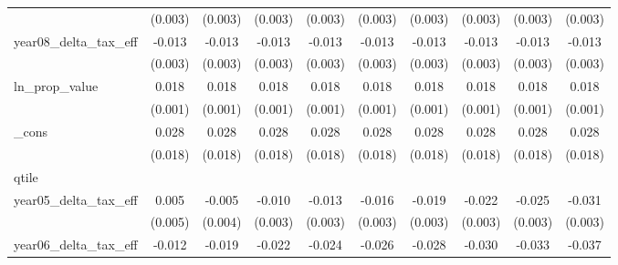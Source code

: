 {\begin{tabular}{l*{9}{c}}
            &     (0.003)         &     (0.003)         &     (0.003)         &     (0.003)         &     (0.003)         &     (0.003)         &     (0.003)         &     (0.003)         &     (0.003)         \\
[1em]
year08_delta_tax_eff&      -0.013\sym{***}&      -0.013\sym{***}&      -0.013\sym{***}&      -0.013\sym{***}&      -0.013\sym{***}&      -0.013\sym{***}&      -0.013\sym{***}&      -0.013\sym{***}&      -0.013\sym{***}\\
            &     (0.003)         &     (0.003)         &     (0.003)         &     (0.003)         &     (0.003)         &     (0.003)         &     (0.003)         &     (0.003)         &     (0.003)         \\
[1em]
ln_prop_value&       0.018\sym{***}&       0.018\sym{***}&       0.018\sym{***}&       0.018\sym{***}&       0.018\sym{***}&       0.018\sym{***}&       0.018\sym{***}&       0.018\sym{***}&       0.018\sym{***}\\
            &     (0.001)         &     (0.001)         &     (0.001)         &     (0.001)         &     (0.001)         &     (0.001)         &     (0.001)         &     (0.001)         &     (0.001)         \\
[1em]
_cons       &       0.028         &       0.028         &       0.028         &       0.028         &       0.028         &       0.028         &       0.028         &       0.028         &       0.028         \\
            &     (0.018)         &     (0.018)         &     (0.018)         &     (0.018)         &     (0.018)         &     (0.018)         &     (0.018)         &     (0.018)         &     (0.018)         \\
\hline
qtile       &                     &                     &                     &                     &                     &                     &                     &                     &                     \\
year05_delta_tax_eff&       0.005         &      -0.005         &      -0.010\sym{***}&      -0.013\sym{***}&      -0.016\sym{***}&      -0.019\sym{***}&      -0.022\sym{***}&      -0.025\sym{***}&      -0.031\sym{***}\\
            &     (0.005)         &     (0.004)         &     (0.003)         &     (0.003)         &     (0.003)         &     (0.003)         &     (0.003)         &     (0.003)         &     (0.003)         \\
[1em]
year06_delta_tax_eff&      -0.012\sym{**} &      -0.019\sym{***}&      -0.022\sym{***}&      -0.024\sym{***}&      -0.026\sym{***}&      -0.028\sym{***}&      -0.030\sym{***}&      -0.033\sym{***}&      -0.037\sym{***}\\

\end{tabular}}
